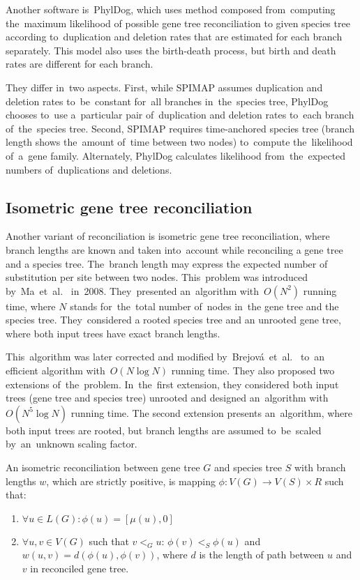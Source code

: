 Another software is~PhylDog\cite{phyldog}, which uses method composed from~computing the~maximum likelihood of possible gene tree reconciliation to given species tree according to~duplication and deletion rates that are estimated for each branch separately. This model also uses the birth-death process, but birth and death rates are different for each branch.

They differ in~two aspects. First, while SPIMAP assumes duplication and deletion rates to~be~constant for~all branches in~the~species tree, PhylDog chooses to~use a~particular pair of~duplication and deletion rates to~each branch of~the~species tree. Second, SPIMAP requires time-anchored species tree (branch length shows the~amount of~time between two nodes) to~compute the~likelihood of~a~gene family. Alternately, PhylDog calculates likelihood from~the~expected numbers of~duplications and deletions. 


\subsection{Isometric gene tree reconciliation}
Another variant of reconciliation is isometric gene tree reconciliation, where branch lengths are known and taken into~account while reconciling a gene tree and a species tree. The~branch length may express the expected number of substitution per site between two nodes. This~problem was introduced by~Ma~et~al.~\cite{ma} in~2008. They~presented an~algorithm with~$O(N^2)$ running time, where $N$ stands for~the~total number of~nodes in~the gene tree and the species tree. They~considered a rooted species tree and an unrooted gene tree, where both input trees have exact branch lengths.

This~algorithm was later corrected and modified by~Brejová~et~al.~\cite{brejova} to~an efficient algorithm with~$O(N \log N)$ running time. They also proposed two extensions of~the~problem. In~the~first extension, they considered both input trees (gene tree and species tree) unrooted and designed an~algorithm with~$O(N^5 \log N)$ running time. The second extension presents an~algorithm, where both input trees are rooted, but branch lengths are assumed to~be~scaled by~an~unknown scaling factor.

\begin{definition}
An isometric reconciliation between gene tree $G$ and species tree $S$ with branch lengths $w$, which are strictly positive, is mapping $\phi: V(G) \rightarrow V(S) \times R$ such that:
	\begin{enumerate}\itemsep0em
	\item $\forall u \in L(G): \phi(u) = [\mu(u), 0]$
	\item $\forall u, v \in V(G)$ such that $v<_Gu$: $\phi(v)<_S\phi(u)$ and $w(u, v) = d(\phi(u), \phi(v))$, where $d$ is the length of path between $u$ and $v$ in reconciled gene tree.
	\end{enumerate}
\end{definition}

